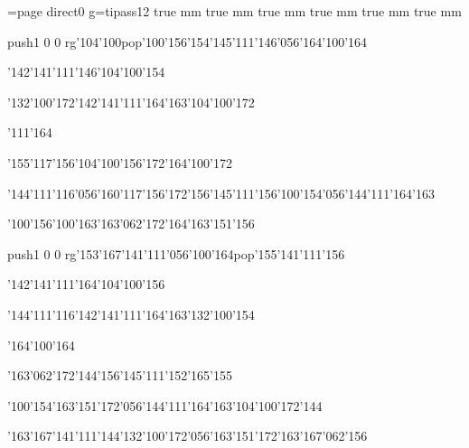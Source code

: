 \chardef\match=\pdfcolorstackinit page direct{0 g}\nopagenumbers\font\ipa=tipass12 true mm true mm true mm true mm true mm true mm
\null\vfill\ipa\centerline{\enskip\pdfcolorstack\match push{1 0 0 rg}\char'104\char'100\pdfcolorstack\match pop{}\enskip\enskip\enskip\enskip\enskip\char'100\char'156\enskip\char'154\char'145\char'111\char'146\char'056\char'164\char'100\char'164}\medskip\centerline{\enskip\enskip\enskip\enskip\char'142\char'141\char'111\char'146\enskip\enskip\enskip\enskip\char'104\char'100\char'154}\medskip\centerline{\enskip\enskip\char'132\char'100\char'172\enskip\enskip\char'142\char'141\char'111\char'164\char'163\enskip\enskip\enskip\enskip\char'104\char'100\char'172}\medskip\centerline{\enskip\char'111\char'164\enskip\enskip\enskip\enskip\enskip\enskip\enskip\enskip\enskip\enskip\enskip}\medskip\centerline{\enskip\char'155\char'117\char'156\enskip\char'104\char'100\char'156\char'172\enskip\enskip\enskip\enskip\enskip\enskip\enskip\enskip\enskip\enskip\enskip\enskip\char'164\char'100\char'172}\medskip\centerline{\enskip\enskip\enskip\enskip\char'144\char'111\char'116\char'056\char'160\char'117\char'156\char'172\enskip\char'156\char'145\char'111\enskip\char'156\char'100\char'154\char'056\char'144\char'111\char'164\char'163}\medskip\centerline{\enskip\enskip\enskip\enskip\enskip\char'100\char'156\enskip\char'100\char'163\enskip\enskip\enskip\enskip\enskip\enskip\enskip\char'163\char'062\char'172\enskip\char'164\char'163\char'151\char'156}\medskip\vfill\footline{\hfil\tt\folio\hfil}\eject
\null\vfill\ipa\centerline{\enskip\enskip\enskip\enskip\pdfcolorstack\match push{1 0 0 rg}\char'153\char'167\char'141\char'111\char'056\char'100\char'164\pdfcolorstack\match pop{}\enskip\char'155\char'141\char'111\char'156\enskip\enskip\enskip\enskip}\medskip\centerline{\enskip\enskip\enskip\enskip\char'142\char'141\char'111\char'164\enskip\enskip\enskip\enskip\char'104\char'100\char'156}\medskip\centerline{\enskip\enskip\char'144\char'111\char'116\enskip\enskip\char'142\char'141\char'111\char'164\char'163\enskip\enskip\enskip\enskip\char'132\char'100\char'154}\medskip\centerline{\enskip\enskip\enskip\enskip\enskip\enskip\enskip\enskip\enskip\enskip\enskip\char'164\char'100\char'164}\medskip\centerline{\enskip\enskip\enskip\enskip\enskip\char'163\char'062\char'172\char'144\enskip\enskip\enskip\enskip\enskip\enskip\char'156\char'145\char'111\enskip\enskip\enskip\char'152\char'165\char'155}\medskip\centerline{\enskip\char'100\char'154\enskip\char'163\char'151\char'172\char'056\char'144\char'111\char'164\char'163\enskip\enskip\enskip\enskip\enskip\enskip\enskip\enskip\char'104\char'100\char'172\char'144}\medskip\centerline{\enskip\char'163\char'167\char'141\char'111\enskip\enskip\enskip\enskip\enskip\enskip\enskip\enskip\enskip\char'144\char'132\char'100\char'172\char'056\char'163\char'151\char'172\enskip\char'163\char'167\char'062\char'156}\medskip\vfill\footline{\hfil\tt\folio\hfil}\eject
